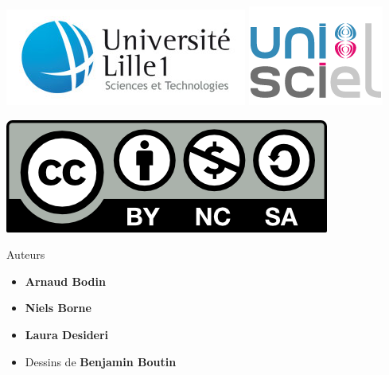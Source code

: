 








\begin{frame}

\thispagestyle{empty}    

  \hspace*{-20ex}
  \begin{minipage}{0.6\textwidth}
  \begin{center}
    \vspace*{5ex}   


    \bigskip

    \includegraphics[scale=0.3]{../divers/logotypeLille1-QUADRI-ECRAN.jpg}
    \quad
    \includegraphics[scale=0.3]{../divers/logo-unisciel.png}

    \vspace*{5ex}

    \includegraphics[scale=0.5]{../divers/by-nc-sa.png}
  \end{center}
  \end{minipage}
  \hfil
  \begin{minipage}{0.50\textwidth}
  \vspace*{5ex}
  Auteurs
  \begin{itemize}
    \item {\bf Arnaud Bodin}
    \item {\bf Niels Borne}
    \item {\bf Laura Desideri}
    \item Dessins de {\bf \small Benjamin Boutin}    
  \end{itemize}


\end{minipage}
\end{frame}
